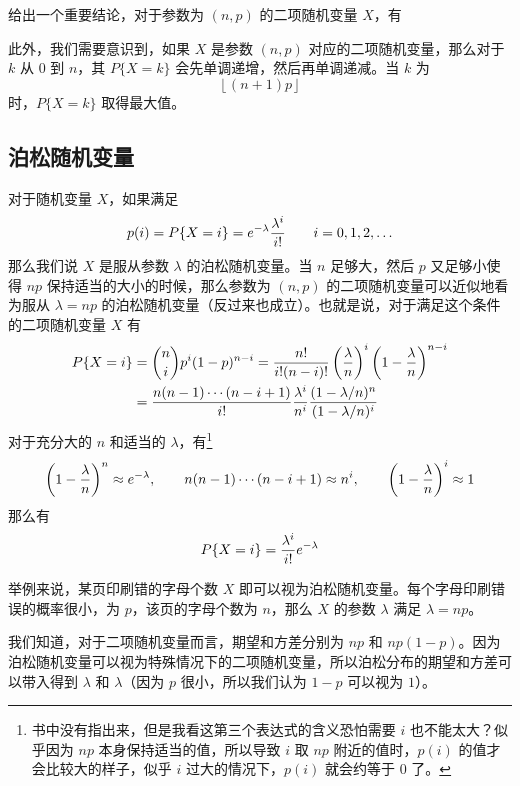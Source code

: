 \documentclass[utf8,a4paper,nofonts,9pt]{ctexbook}
\begin{document}
给出一个重要结论，对于参数为 $(n, p)$ 的二项随机变量 $X$，有
\begin{center}
\end{center}

此外，我们需要意识到，如果 $X$ 是参数 $(n, p)$ 对应的二项随机变量，那么对于 $k$ 从 $0$ 到 $n$，其 $P\{ X = k \}$ 会先单调递增，然后再单调递减。当 $k$ 为
\[
    \left\lfloor (n + 1) p \right\rfloor
\]
时，$P\{X = k\}$ 取得最大值。

\subsection{泊松随机变量}

对于随机变量 $X$，如果满足
\[
    p(i) = P\{X = i\} = e^{-\lambda} {\lambda^i \over i!} \qquad i = 0, 1, 2, \ldots
\]
那么我们说 $X$ 是服从参数 $\lambda$ 的泊松随机变量。当 $n$ 足够大，然后 $p$ 又足够小使得 $np$ 保持适当的大小的时候，那么参数为 $(n, p)$ 的二项随机变量可以近似地看为服从 $\lambda = np$ 的泊松随机变量（反过来也成立）。也就是说，对于满足这个条件的二项随机变量 $X$ 有
\begin{align*}
    P\{X = i\} & = {n \choose i} p^i (1 - p)^{n - i} = {n! \over i! (n - i)!} \left( {\lambda \over n} \right)^i \left( 1 - {\lambda \over n} \right)^{n - i} \\
               & = {n (n - 1) \cdots (n - i + 1) \over i!} {\lambda^i \over n^i} {(1 - \lambda / n)^n \over (1 - \lambda / n)^i}
\end{align*}
对于充分大的 $n$ 和适当的 $\lambda$，有\footnote{书中没有指出来，但是我看这第三个表达式的含义恐怕需要 $i$ 也不能太大？似乎因为 $np$ 本身保持适当的值，所以导致 $i$ 取 $np$ 附近的值时，$p(i)$ 的值才会比较大的样子，似乎 $i$ 过大的情况下，$p(i)$ 就会约等于 $0$ 了。}
\[
    \left(1 - {\lambda \over n}\right)^n \approx e^{-\lambda}, \qquad n (n - 1) \cdots (n - i + 1) \approx n^i, \qquad \left(1 - {\lambda \over n}\right)^i \approx 1
\]
那么有
\[
    P\{X = i\} = {\lambda^i \over i!} e^{-\lambda}
\]

举例来说，某页印刷错的字母个数 $X$ 即可以视为泊松随机变量。每个字母印刷错误的概率很小，为 $p$，该页的字母个数为 $n$，那么 $X$ 的参数 $\lambda$ 满足 $\lambda = np$。

我们知道，对于二项随机变量而言，期望和方差分别为 $np$ 和 $np(1 - p)$。因为泊松随机变量可以视为特殊情况下的二项随机变量，所以泊松分布的期望和方差可以带入得到 $\lambda$ 和 $\lambda$（因为 $p$ 很小，所以我们认为 $1 - p$ 可以视为 $1$）。
\end{document}
